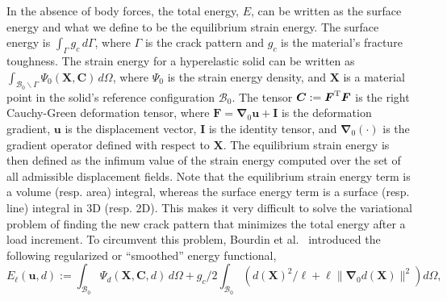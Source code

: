 \documentclass[10pt,letterpaper]{article}
\newcommand{\bs}[1]{\ensuremath{\boldsymbol{#1}}}
\begin{document}
\begin{mdframed}
                       In the absence of body forces, the total energy, $E$, can be written as the surface energy and what we define to be the equilibrium strain energy. The surface energy is  $\int_{\Gamma}g_c\, d\Gamma$,  where $\Gamma$ is the crack pattern and $g_c$ is the material's fracture toughness.
                       The strain energy  for a hyperelastic solid can be written as $\int_{\mathcal{B}_0\backslash \Gamma}\Psi_{0}(\bs{X}, \bs{C})\, d\Omega$, where $\Psi_0$ is the strain energy density, and $\bs{X}$ is a material point in the solid's reference configuration $\mathcal{B}_0$. The tensor $\bs{C}:=\bs{F}^{\rm T}\bs{F}$ is the right Cauchy-Green deformation tensor, where $\bs{F}=\bs{\nabla}_{0}\bs{u}+\bs{I}$ is the deformation gradient, $\bs{u}$ is the displacement vector, $\bs{I}$ is the identity tensor, and $\bs{\nabla}_0(\cdot)$ is the gradient operator defined with respect to $\bs{X}$. The equilibrium strain energy is then defined as the infimum value of the strain energy computed over the set of all admissible displacement fields. Note that the equilibrium strain energy term is a volume (resp. area) integral, whereas the surface energy term is a surface (resp. line) integral in 3D (resp. 2D). This makes it very difficult to solve the variational problem of finding the new crack pattern that minimizes the total energy after a load increment. To circumvent this problem,  Bourdin et al.~\cite{bourdin2000numerical} introduced the following regularized or ``smoothed'' energy functional,
                       \begin{equation}
                       \label{eq:PFT-Functional}
                       E_{\ell}(\bs{u},d):=
                       \int_{\mathcal{B}_0}
                       \Psi_{d}(\mathbf{X},\bs{C}, d)
                       \, d\Omega+
                       g_c/2
                       \int_{\mathcal{B}_0}
                       \left(
                       d(\bs{X})^2/\ell + \ell \lVert\bs{\nabla}_0d(\bs{X})\rVert^2
                       \right)
                       d\Omega,
                       \end{equation}

\end{mdframed}
\end{document}
